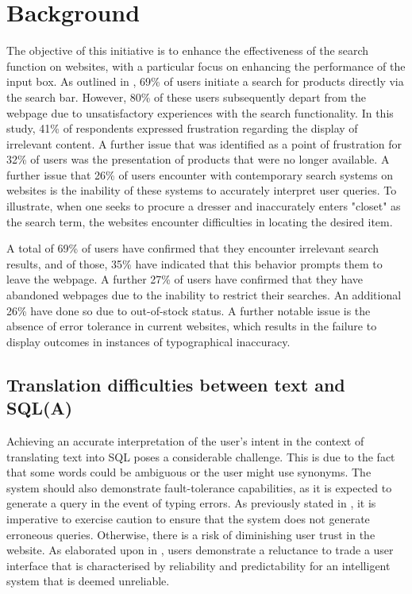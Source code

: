 \documentclass[../../submission.tex]{subfiles}
\begin{document}
\section{Background}
The objective of this initiative is to enhance the effectiveness of the search function on websites, with a particular focus on enhancing the performance of the input box. 
As outlined in  \cite{customerLeavingSites} , 69\% of users initiate a search for products directly via the search bar. 
However, 80\% of these users subsequently depart from the webpage due to unsatisfactory experiences with the search functionality. 
In this study, 41\% of respondents expressed frustration regarding the display of irrelevant content. 
A further issue that was identified as a point of frustration for 32\% of users was the presentation of products that were no longer available. 
A further issue that 26\% of users encounter with contemporary search systems on websites is the inability of these systems to accurately interpret user queries. 
To illustrate, when one seeks to procure a dresser and inaccurately enters "closet" as the search term, the websites encounter difficulties in locating the desired item.

A total of 69\% of users have confirmed that they encounter irrelevant search results, and of those, 35\% have indicated that this behavior prompts them to leave the webpage. 
A further 27\% of users have confirmed that they have abandoned webpages due to the inability to restrict their searches. An additional 26\% have done so due to out-of-stock status. 
A further notable issue is the absence of error tolerance in current websites, which results in the failure to display outcomes in instances of typographical inaccuracy.

\subsection{Translation difficulties between text and SQL(A)}
Achieving an accurate interpretation of the user's intent in the context of translating text into SQL poses a considerable challenge. 
This is due to the fact that some words could be ambiguous or the user might use synonyms.  
The system should also demonstrate fault-tolerance capabilities, as it is expected to generate a query in the event of typing errors. 
As previously stated in \cite{popescuEtalTowardsTheoryOfNaturalLanguage}, it is imperative to exercise caution to ensure that the system does not generate erroneous queries. 
Otherwise, there is a risk of diminishing user trust in the website.  
As elaborated upon in  \cite{popescuEtalTowardsTheoryOfNaturalLanguage}, users demonstrate a reluctance to trade a user interface that is characterised by reliability and predictability for an intelligent system that is deemed unreliable.
\end{document}
